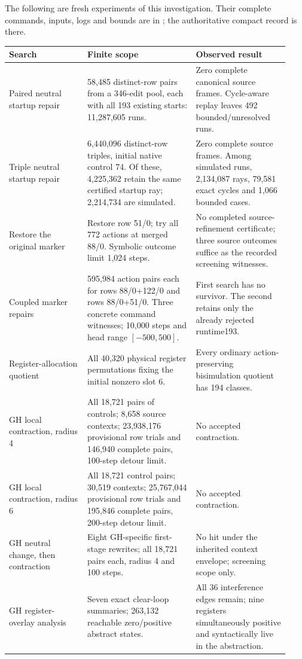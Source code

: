 The following are fresh experiments of this investigation. Their complete
commands, inputs, logs and bounds are in ; the
authoritative compact record is  there.

\begin{longtable}{@{}p{0.26\linewidth}p{0.36\linewidth}p{0.31\linewidth}@{}}
\toprule Search & Finite scope & Observed result\\\midrule\endhead
Paired neutral startup repair & 58,485 distinct-row pairs from a 346-edit pool, each with all 193 existing starts: 11,287,605 runs. & Zero complete canonical source frames. Cycle-aware replay leaves 492 bounded/unresolved runs.\\[3pt]
Triple neutral startup repair & 6,440,096 distinct-row triples, initial native control 74. Of these, 4,225,362 retain the same certified startup ray; 2,214,734 are simulated. & Zero complete source frames. Among simulated runs, 2,134,087 rays, 79,581 exact cycles and 1,066 bounded cases.\\[3pt]
Restore the original marker & Restore row 51/0; try all 772 actions at merged 88/0. Symbolic outcome limit 1,024 steps. & No completed source-refinement certificate; three source outcomes suffice as the recorded screening witnesses.\\[3pt]
Coupled marker repairs & 595,984 action pairs each for rows 88/0+122/0 and rows 88/0+51/0. Three concrete command witnesses; 10,000 steps and head range $[-500,500]$. & First search has no survivor. The second retains only the already rejected runtime193.\\[3pt]
Register-allocation quotient & All 40,320 physical register permutations fixing the initial nonzero slot 6. & Every ordinary action-preserving bisimulation quotient has 194 classes.\\[3pt]
GH local contraction, radius 4 & All 18,721 pairs of controls; 8,658 source contexts; 23,938,176 provisional row trials and 146,940 complete pairs, 100-step detour limit. & No accepted contraction.\\[3pt]
GH local contraction, radius 6 & All 18,721 control pairs; 30,519 contexts; 25,767,044 provisional row trials and 195,846 complete pairs, 200-step detour limit. & No accepted contraction.\\[3pt]
GH neutral change, then contraction & Eight GH-specific first-stage rewrites; all 18,721 pairs each, radius 4 and 100 steps. & No hit under the inherited context envelope; screening scope only.\\[3pt]
GH register-overlay analysis & Seven exact clear-loop summaries; 263,132 reachable zero/positive abstract states. & All 36 interference edges remain; nine registers simultaneously positive and syntactically live in the abstraction.\\
\bottomrule\end{longtable}

